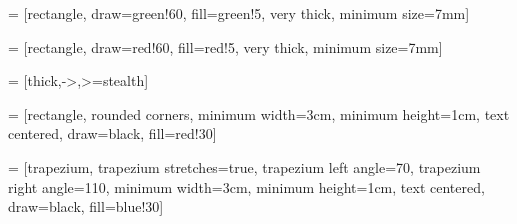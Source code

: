 
\usepackage{tikz}
\usetikzlibrary{positioning, tikzmark, calc, shapes.geometric, arrows}  %

\newenvironment{myTree}
{
    \begingroup
    \begin{center}
    \begin{tikzpicture}[level distance=1.5cm, level 1/.style={sibling distance=3cm}, level 2/.style={sibling distance=1.5cm}]
}
{
    \end{tikzpicture}
    \end{center}
    \endgroup
}


\newenvironment{myTreeLThree}
{
    \begingroup
    \begin{center}
    \begin{tikzpicture}[level distance=1.5cm, level 1/.style={sibling distance=6cm}, level 2/.style={sibling distance=3cm}, level 3/.style={sibling distance=1.5cm}]
}
{
    \end{tikzpicture}
    \end{center}
    \endgroup
}

\newenvironment{vArrow}[3][black]
{
    \draw[->, #1] (#2) -- (#3);
}
{

}

\newenvironment{tArcDown}[2][black]
{
    \draw[-latex,#1] ($#2$) arc [ start angle=-160, end angle=-20, x radius=0.9cm, y radius =0.7cm ] ;
}
{

}


\newenvironment{tArcUp}[2][red]
{
    \draw[-latex,#1] ($#2$) arc [ start angle=160, end angle=20, x radius=0.9cm, y radius =0.7cm ] ;
}
{

}

 = [rectangle, draw=green!60, fill=green!5, very thick, minimum size=7mm]

 = [rectangle, draw=red!60, fill=red!5, very thick, minimum size=7mm]

 = [thick,->,>=stealth]

 = [rectangle, rounded corners, minimum width=3cm, minimum height=1cm, text centered, draw=black, fill=red!30]

 = [trapezium, trapezium stretches=true, trapezium left angle=70, trapezium right angle=110, minimum width=3cm, minimum height=1cm, text centered, draw=black, fill=blue!30]

